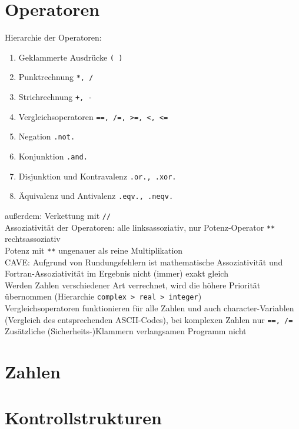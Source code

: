 \documentclass[a4paper,10pt, twocolumn]{scrarticle}
\begin{document}
  \section{Operatoren}
  Hierarchie der Operatoren:
  \begin{enumerate}
    \item Geklammerte Ausdrücke \lstinline|( )|
    \item Punktrechnung \lstinline|*, /|
    \item Strichrechnung \lstinline|+, -|
    \item Vergleichsoperatoren \lstinline|==, /=, >=, <, <=|
    \item Negation \lstinline|.not.|
    \item Konjunktion \lstinline|.and.|
    \item Disjunktion und Kontravalenz \lstinline|.or., .xor.|
    \item Äquivalenz und Antivalenz \lstinline|.eqv., .neqv.|
  \end{enumerate}
  außerdem: Verkettung mit \lstinline|//|\\
  Assoziativität der Operatoren: alle linksassoziativ, nur Potenz-Operator \lstinline|**| rechtsassoziativ\\
  Potenz mit \lstinline|**| ungenauer als reine Multiplikation\\
  CAVE: Aufgrund von Rundungsfehlern ist mathematische Assoziativität und Fortran-Assoziativität im Ergebnis nicht (immer) exakt gleich \\
  Werden Zahlen verschiedener Art verrechnet, wird die höhere Priorität übernommen (Hierarchie \lstinline|complex > real > integer|)\\
  Vergleichsoperatoren funktionieren für alle Zahlen und auch character-Variablen (Vergleich des entsprechenden ASCII-Codes), bei komplexen Zahlen nur \lstinline|==, /=|\\
  Zusätzliche (Sicherheits-)Klammern verlangsamen Programm nicht
  
  \section{Zahlen}
  
  \section{Kontrollstrukturen}
\end{document}
